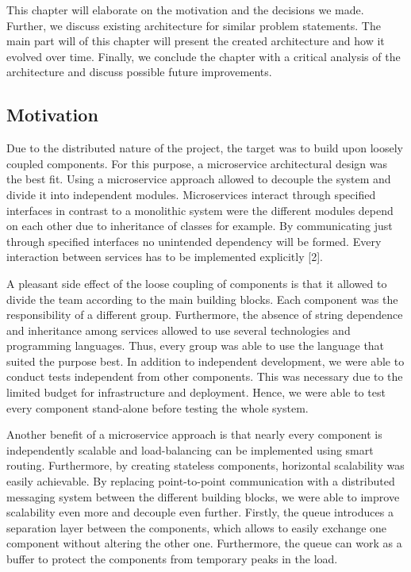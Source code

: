 This chapter will elaborate on the motivation and the decisions we made.
Further, we discuss existing architecture for similar problem
statements. The main part will of this chapter will present the created
architecture and how it evolved over time. Finally, we conclude the
chapter with a critical analysis of the architecture and discuss
possible future improvements.

\subsection{Motivation}\label{motivation}

Due to the distributed nature of the project, the target was to build
upon loosely coupled components. For this purpose, a microservice
architectural design was the best fit. Using a microservice approach
allowed to decouple the system and divide it into independent modules.
Microservices interact through specified interfaces in contrast to a
monolithic system were the different modules depend on each other due to
inheritance of classes for example. By communicating just through
specified interfaces no unintended dependency will be formed. Every
interaction between services has to be implemented explicitly {[}2{]}.

A pleasant side effect of the loose coupling of components is that it
allowed to divide the team according to the main building blocks. Each
component was the responsibility of a different group. Furthermore, the
absence of string dependence and inheritance among services allowed to
use several technologies and programming languages. Thus, every group
was able to use the language that suited the purpose best. In addition
to independent development, we were able to conduct tests independent
from other components. This was necessary due to the limited budget for
infrastructure and deployment. Hence, we were able to test every
component stand-alone before testing the whole system.

Another benefit of a microservice approach is that nearly every
component is independently scalable and load-balancing can be
implemented using smart routing. Furthermore, by creating stateless
components, horizontal scalability was easily achievable. By replacing
point-to-point communication with a distributed messaging system between
the different building blocks, we were able to improve scalability even
more and decouple even further. Firstly, the queue introduces a
separation layer between the components, which allows to easily exchange
one component without altering the other one. Furthermore, the queue can
work as a buffer to protect the components from temporary peaks in the
load.

